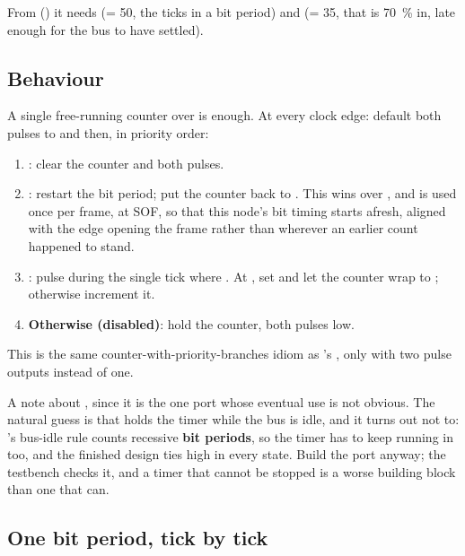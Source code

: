 From  () it needs  (= 50, the ticks in a bit
period) and  (= 35, that is 70~\% in, late enough for the bus to have settled).

\subsection{Behaviour}
\label{c12:sub:btbehav}

A single free-running counter over  is enough. At every clock edge:
default both pulses to  and then, in priority order:
\begin{enumerate}
  \item \textbf{}: clear the counter and both pulses.
  \item \textbf{}: restart the bit period; put the counter back to . This
    wins over , and is used once per frame, at SOF, so that this node's bit timing
    starts afresh, aligned with the edge opening the frame rather than wherever an earlier count
    happened to stand.
  \item \textbf{}: pulse  during the single tick where
    . At , set  and let
    the counter wrap to ; otherwise increment it.
  \item \textbf{Otherwise (disabled)}: hold the counter, both pulses low.
\end{enumerate}

This is the same counter-with-priority-branches idiom as 's , only with
two pulse outputs instead of one.

\begin{aside}
A note about , since it is the one port whose eventual use is not obvious. The natural
guess is that  holds the timer while the bus is idle, and it turns out not to:
's bus-idle rule counts recessive \textbf{bit periods}, so the timer has to keep
running in  too, and the finished design ties  high in every state.
Build the port anyway; the testbench checks it, and a timer that cannot be stopped is a worse building
block than one that can.
\end{aside}

\subsection{One bit period, tick by tick}
\label{c12:sub:bttrace}

